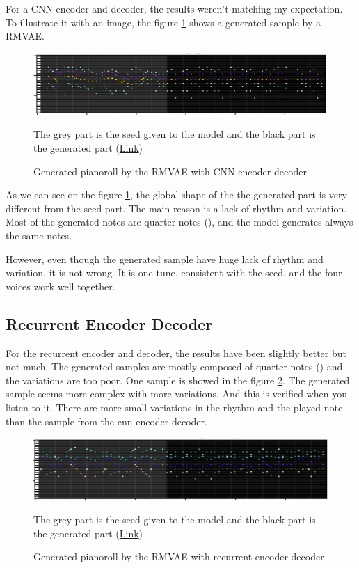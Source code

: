 \documentclass[12pt]{report}
\begin{document}
For a CNN encoder and decoder, the results weren't matching my expectation.
To illustrate it with an image, the figure \ref{fig:rmvae-generated} shows a generated sample by a RMVAE.

\begin{figure}[htpb]
    \centering
    \includegraphics[width=\textwidth]{images/generated_midis/RMVAE/generated_cnn.jpg}
    \caption{Generated pianoroll by the RMVAE with CNN encoder decoder}
    The grey part is the seed given to the model and the black part is the generated part   (\href{https://github.com/ValentinVignal/midiGenerator/blob/master/samples/results/generated_pianoroll.mid}{Link})
    \label{fig:rmvae-generated}
\end{figure}

As we can see on the figure \ref{fig:rmvae-generated}, the global shape of the the generated part is very different from the seed part.
The main reason is a lack of rhythm and variation.
Most of the generated notes are quarter notes (\musQuarter), and the model generates always the same notes.

However, even though the generated sample have huge lack of rhythm and variation, it is not wrong.
It is one tune, consistent with the seed, and the four voices work well together.

\subsection{Recurrent Encoder Decoder}

For the recurrent encoder and decoder, the results have been slightly better but not much.
The generated samples are mostly composed of quarter notes (\musQuarter) and the variations are too poor.
One sample is showed in the figure \ref{fig:rrmvae-generated}.
The generated sample seems more complex with more variations.
And this is verified when you listen to it.
There are more small variations in the rhythm and the played note than the sample from the cnn encoder decoder.

\begin{figure}[htpb]
    \centering
    \includegraphics[width=\textwidth]{images/generated_midis/RRMVAE/generated-rnn.jpg}
    \caption{Generated pianoroll by the RMVAE with recurrent encoder decoder}
    The grey part is the seed given to the model and the black part is the generated part   (\href{https://github.com/ValentinVignal/midiGenerator/blob/master/samples/results/generated-pianoroll-rnn.mid}{Link})
    \label{fig:rrmvae-generated}
\end{figure}
\end{document}
